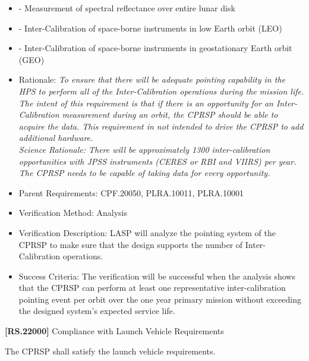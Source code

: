 \documentclass[12pt,oneside,oldfontcommands]{memoir}
\begin{document}
\begin{itemize}
\item{} - Measurement of spectral reflectance over entire lunar disk

\item{} - Inter-Calibration of space-borne instruments in low Earth orbit (LEO)

\item{} - Inter-Calibration of space-borne instruments in geostationary Earth orbit (GEO)

\item{} Rationale: \emph{To ensure that there will be adequate pointing capability in the HPS to perform all of the Inter-Calibration operations during the mission life. The intent of this requirement is that if there is an opportunity for an Inter-Calibration measurement during an orbit, the CPRSP should be able to acquire the data. This requirement in not intended to drive the CPRSP to add additional hardware.\\
Science Rationale: There will be approximately 1300 inter-calibration opportunities with JPSS instruments (CERES or RBI and VIIRS) per year. The CPRSP needs to be capable of taking data for every opportunity.}

\item{} Parent Requirements: \gls{CPF}.20050, PLRA.10011, PLRA.10001

\item{} Verification Method: Analysis

\item{} Verification Description: \gls{LASP} will analyze the \gls{point}ing system of the \gls{CPRSP} to make sure that the design supports the number of Inter-Calibration operations.

\item{} Success Criteria: The verification will be successful when the \gls{analysis} shows that the \gls{CPRSP} can perform at least one representative inter-calibration \gls{point}ing event per orbit over the one year primary mission without exceeding the designed system's expected service life.

\end{itemize}

\textbf{[RS.22000]} Compliance with Launch Vehicle Requirements

The \gls{CPRSP} shall satisfy the launch vehicle requirements.
\end{document}
